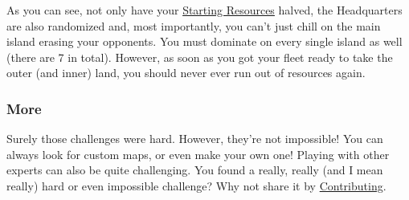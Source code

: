 \documentclass[12pt]{article}
\begin{document}
As you can see, not only have your \hyperref[sec:startingresources]{Starting Resources} halved, the Headquarters are also randomized and, most importantly, you can't just chill on the main island erasing your opponents. You must dominate on every single island as well (there are 7 in total). However, as soon as you got your fleet ready to take the outer (and inner) land, you should never ever run out of resources again.

\subsubsection{More}
\label{sec:challenge_more}

Surely those challenges were hard. However, they're not impossible! You can always look for custom maps, or even make your own one! Playing with other experts can also be quite challenging. You found a really, really (and I mean really) hard or even impossible challenge? Why not share it by \hyperref[sec:contributing]{Contributing}.
\end{document}

